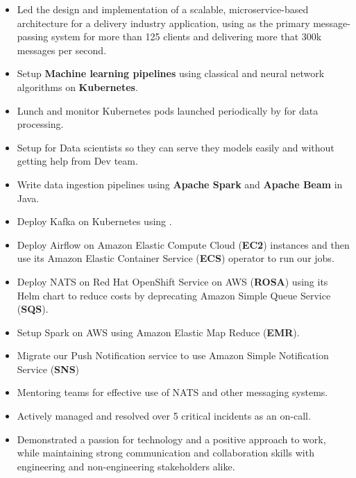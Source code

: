 \begin{itemize}
      \item Led the design and implementation of a scalable, microservice-based architecture for a delivery industry application,
            using  as the primary message-passing system for more than 125 clients and delivering
            more that 300k messages per second.
      \item Setup \textbf{Machine learning pipelines} using classical and neural network algorithms on \textbf{Kubernetes}.
      \item Lunch and monitor Kubernetes pods launched periodically by  for data processing.
      \item Setup  for Data scientists so they can serve they models easily and without getting help from Dev team.
      \item Write data ingestion pipelines using \textbf{Apache Spark} and \textbf{Apache Beam} in Java.
      \item Deploy Kafka on Kubernetes using .
      \item Deploy Airflow on Amazon Elastic Compute Cloud (\textbf{EC2}) instances and then use its Amazon Elastic Container Service (\textbf{ECS}) operator to run our jobs.
      \item Deploy NATS on Red Hat OpenShift Service on AWS (\textbf{ROSA})
            using its Helm chart to reduce costs by deprecating Amazon Simple Queue Service (\textbf{SQS}).
      \item Setup Spark on AWS using Amazon Elastic Map Reduce (\textbf{EMR}).
      \item Migrate our Push Notification service to use Amazon Simple Notification Service (\textbf{SNS})
      \item Mentoring teams for effective use of NATS and other messaging systems.
      \item Actively managed and resolved over 5 critical incidents as an on-call.
      \item Demonstrated a passion for technology and a positive approach to work,
            while maintaining strong communication and collaboration skills with engineering
            and non-engineering stakeholders alike.
\end{itemize}


